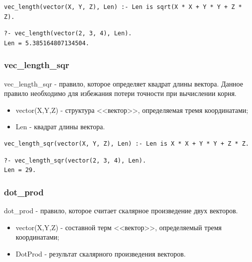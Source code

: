 \begin{lstlisting}[caption=Реализация правила vec\_length, label=rules:veclength]
vec_length(vector(X, Y, Z), Len) :- Len is sqrt(X * X + Y * Y + Z * Z).
\end{lstlisting}

\begin{lstlisting}[caption=Пример использования правила vec\_length, label=example:veclength]
?- vec_length(vector(2, 3, 4), Len).
Len = 5.385164807134504.
\end{lstlisting}

\subsubsection{vec\_length\_sqr}

\hspace{0.6cm} vec\_length\_sqr - правило, которое определяет квадрат длины вектора. Данное правило необходимо для избежания потери точности при вычислении корня.

\begin{itemize}
	\item vector(X,Y,Z) - структура <<вектор>>, определяемая тремя координатами;
	\item Len - квадрат длины вектора.
\end{itemize}

\begin{lstlisting}[caption=Реализация правила vec\_length\_sqr, label=rules:veclengthsqr]
vec_length_sqr(vector(X, Y, Z), Len) :- Len is X * X + Y * Y + Z * Z.
\end{lstlisting}

\begin{lstlisting}[caption=Пример использования правила vec\_length\_sqr, label=example:veclengthsqr]
?- vec_length_sqr(vector(2, 3, 4), Len).
Len = 29.
\end{lstlisting}

\subsubsection{dot\_prod}
\hspace{0.6cm} dot\_prod - правило, которое считает скалярное произведение двух векторов.

\begin{itemize}
	\item vector(X,Y,Z) - составной терм <<вектор>>, определяемый  тремя координатами;
	\item DotProd - результат скалярного произведения векторов.
\end{itemize}

